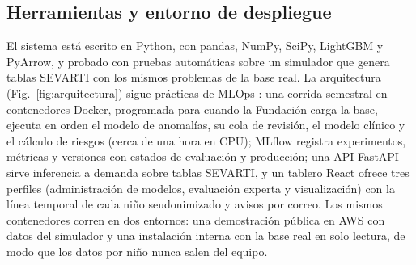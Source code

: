 \subsection{Herramientas y entorno de despliegue}
\label{sec:despliegue}
El sistema está escrito en Python, con pandas, NumPy, SciPy, LightGBM y PyArrow, y probado con pruebas automáticas sobre un simulador que genera tablas SEVARTI con los mismos problemas de la base real. La arquitectura (Fig.~\ref{fig:arquitectura}) sigue prácticas de MLOps \cite{kreuzberger2023}: una corrida semestral en contenedores Docker, programada para cuando la Fundación carga la base, ejecuta en orden el modelo de anomalías, su cola de revisión, el modelo clínico y el cálculo de riesgos (cerca de una hora en CPU); MLflow \cite{zaharia2018} registra experimentos, métricas y versiones con estados de evaluación y producción; una API FastAPI sirve inferencia a demanda sobre tablas SEVARTI, y un tablero React ofrece tres perfiles (administración de modelos, evaluación experta y visualización) con la línea temporal de cada niño seudonimizado y avisos por correo. Los mismos contenedores corren en dos entornos: una demostración pública en AWS con datos del simulador y una instalación interna con la base real en solo lectura, de modo que los datos por niño nunca salen del equipo.


